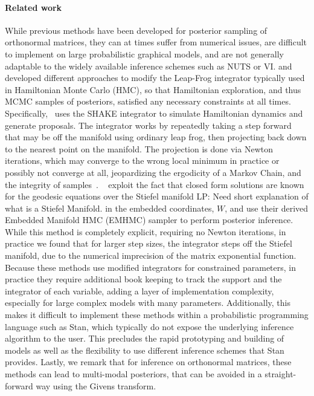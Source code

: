 \documentclass{article}
\newcommand{\commentLP}[1]{{\textcolor{commentLP_color}{LP: #1}}}
\begin{document}
\paragraph{Related work} While previous methods have been developed for posterior sampling of orthonormal matrices, they can at times suffer from numerical issues, are difficult to implement on large probabilistic graphical models, and are not generally adaptable to the widely available inference schemes such as NUTS or VI. \citet{brubaker2012family} and \citet{byrne2013geodesic} developed different approaches to modify the Leap-Frog integrator typically used in Hamiltonian Monte Carlo (HMC), so that Hamiltonian exploration, and thus MCMC samples of posteriors, satisfied any necessary constraints at all times. Specifically,~\citet{brubaker2012family} uses the SHAKE integrator \citep{leimkuhler2004simulating} to simulate Hamiltonian dynamics and generate proposals. The integrator works by repeatedly taking a step forward that may be off the manifold using ordinary leap frog, then projecting back down to the nearest point on the manifold. The projection is done via Newton iterations, which may converge to the wrong local minimum in practice or possibly not converge at all, jeopardizing the ergodicity of a Markov Chain, and the integrity of samples~\citep{betancourt2017divergences}. \citet{byrne2013geodesic}~ exploit the fact that closed form solutions are known for the geodesic equations over the Stiefel manifold \commentLP{Need short explanation of what is a Stiefel Manifold.} in the embedded coordinates, $W$, and use their derived Embedded Manifold HMC (EMHMC) sampler to perform posterior inference. While this method is completely explicit, requiring no Newton iterations, in practice we found that for larger step sizes, the integrator steps off the Stiefel manifold, due to the numerical imprecision of the matrix exponential function. Because these methods use modified integrators for constrained parameters, in practice they require additional book keeping to track the support and the integrator of each variable, adding a layer of implementation complexity, especially for large complex models with many parameters.  Additionally, this makes it difficult to implement these methods within a probabilistic programming language such as Stan, which typically do not expose the underlying inference algorithm to the user. This precludes the rapid prototyping and building of models as well as the flexibility to use different inference schemes that Stan provides. Lastly, we remark that for inference on orthonormal matrices, these methods can lead to multi-modal posteriors, that can be avoided in a straight-forward way using the Givens transform.
\end{document}
